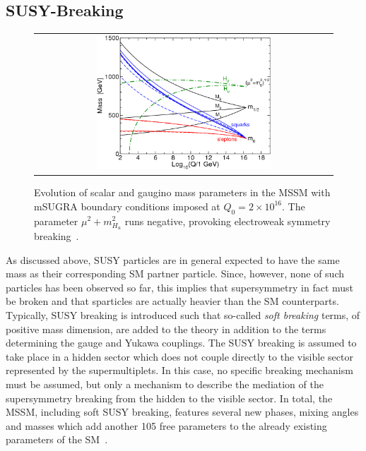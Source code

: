 \subsection{SUSY-Breaking}
\label{subsec:susy_breaking}
\begin{figure}[!t]
  \centering 
  \begin{tabular}{c}
    \includegraphics[width=0.6\textwidth]{figures/MSSMrun.png}
  \end{tabular}
  \caption{Evolution of scalar and gaugino mass parameters in the MSSM with mSUGRA boundary conditions imposed at $Q_0 = 2 \times 10^{16}$\gev. The parameter $\mu^2 + m^2_{H_{u}}$ runs negative, provoking electroweak symmetry breaking~\cite{Martin:1997ns}.}
  \label{fig:MSSMrun}
\end{figure}
As discussed above, SUSY particles are in general expected to have the same mass as their corresponding SM partner particle. Since, however, none of such particles has been observed so far, this implies that supersymmetry in fact must be broken and that sparticles are actually heavier than the SM counterparts. \\%
Typically, SUSY breaking is introduced such that so-called \textit{soft breaking} terms, \ie of positive mass dimension, are added to the theory in addition to the terms determining the gauge and Yukawa couplings. The SUSY breaking is assumed to take place in a hidden sector which does not couple directly to the visible sector represented by the supermultiplets. In this case, no specific breaking mechanism must be assumed, but only a mechanism to describe the mediation of the supersymmetry breaking from the hidden to the visible sector. In total, the MSSM, including soft SUSY breaking, features several new phases, mixing angles and masses which add another 105 free parameters to the already existing parameters of the SM~\cite{Dimopoulos:1995ju}.  \\
